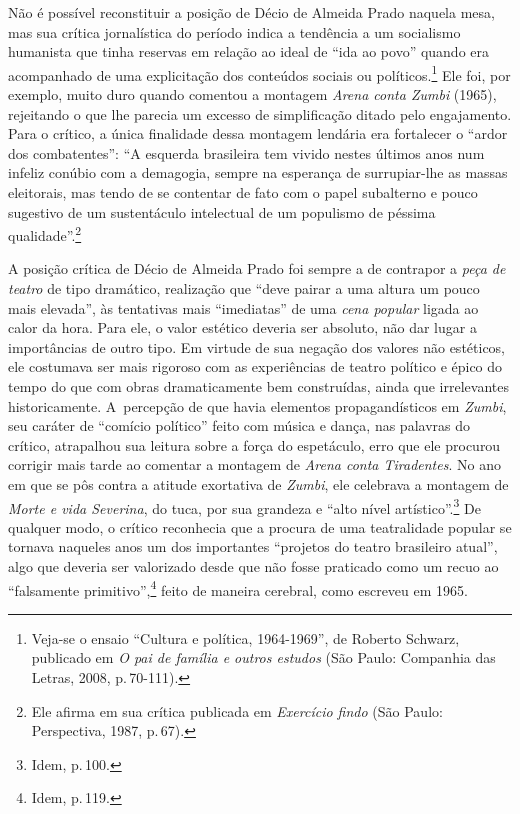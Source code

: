Não é possível reconstituir a posição de Décio de Almeida Prado naquela
mesa, mas sua crítica jornalística do período indica a tendência a um
socialismo humanista que tinha reservas em relação ao ideal de “ida ao
povo” quando era acompanhado de uma explicitação dos conteúdos sociais
ou políticos.\footnote{Veja-se o ensaio “Cultura e política, 1964-1969”,
  de Roberto Schwarz, publicado em {\it O pai de família e outros
  estudos} (São Paulo: Companhia das Letras, 2008, p.\,70-111).} Ele foi,
por exemplo, muito duro quando comentou a montagem {\it Arena conta
Zumbi} (1965), rejeitando o que lhe parecia um excesso de simplificação
ditado pelo engajamento. Para o crítico, a única finalidade dessa
montagem lendária era fortalecer o “ardor dos combatentes”: “A esquerda
brasileira tem vivido nestes últimos anos num infeliz conúbio com a
demagogia, sempre na esperança de surrupiar-lhe as massas eleitorais,
mas tendo de se contentar de fato com o papel subalterno e pouco
sugestivo de um sustentáculo intelectual de um populismo de péssima
qualidade”.\footnote{Ele afirma em sua crítica publicada em
  {\it Exercício findo} (São Paulo: Perspectiva, 1987, p.\,67).}

A posição crítica de Décio de Almeida Prado foi sempre a de contrapor a
{\it peça de teatro} de tipo dramático, realização que “deve pairar a
uma altura um pouco mais elevada”, às tentativas mais “imediatas” de uma
{\it cena popular} ligada ao calor da hora. Para ele, o valor estético
deveria ser absoluto, não dar lugar a importâncias de outro tipo. Em
virtude de sua negação dos valores não estéticos, ele costumava ser mais
rigoroso com as experiências de teatro político e épico do tempo do que
com obras dramaticamente bem construídas, ainda que irrelevantes
historicamente. A~percepção de que havia elementos propagandísticos em
{\it Zumbi}, seu caráter de “comício político” feito com música e
dança, nas palavras do crítico, atrapalhou sua leitura sobre a força do
espetáculo, erro que ele procurou corrigir mais tarde ao comentar a
montagem de {\it Arena conta Tiradentes}. No ano em que se pôs contra a
atitude exortativa de {\it Zumbi}, ele celebrava a montagem
de {\it Morte e vida Severina}, do {\sc tuca}, por sua grandeza e “alto nível
artístico”.\footnote{Idem, p.\,100.} De qualquer modo, o crítico
reconhecia que a procura de uma teatralidade popular se tornava naqueles
anos um dos importantes “projetos do teatro brasileiro atual”, algo que
deveria ser valorizado desde que não fosse praticado como um recuo ao
“falsamente primitivo”,\footnote{Idem, p.\,119.} feito de maneira
cerebral, como escreveu em 1965.

